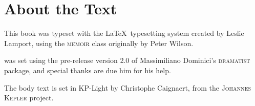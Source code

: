 
\chapter{About the Text}

\begin{adjustwidth}{0.5in}{0.5in}
\begin{center}
\setlength{\parskip}{\baselineskip}

This book was typeset with the \LaTeX\ typesetting system created by Leslie Lamport,
using the \textsc{memoir} class originally by Peter Wilson.

\emph{\theplaytitle} was set using
the pre-release version 2.0 of
Massimiliano Dominici’s \textsc{dramatist} package,
and special thanks are due him for his help.

The body text is set in KP-Light by Christophe Caignaert,
from the \textsc{Johannes Kepler} project.
\end{center}
\end{adjustwidth}

\endinput
